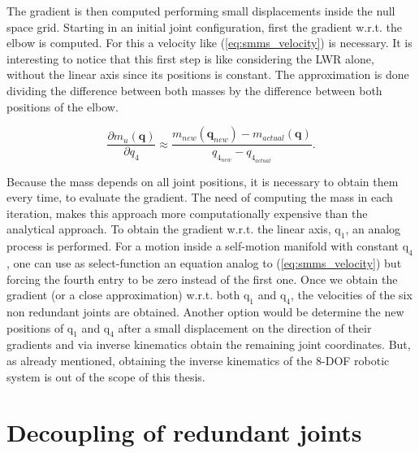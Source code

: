 The gradient is then computed performing small displacements inside the null space grid. Starting in an initial joint configuration, first the gradient w.r.t. the elbow is computed. For this a velocity like (\ref{eq:smms_velocity}) is necessary. It is interesting to notice that this first step is like considering the LWR alone, without the linear axis since its positions is constant. The approximation is done dividing the difference between both  masses by the difference between both positions of the elbow. 



\begin{equation}
\frac{\partial {m_u(\mathbf{q})}}{\partial {q_4}} \approx \frac{m_{new}(\mathbf{q}_{new}) - m_{actual}(\mathbf{q})}{ q_{4_{new}} - q_{4_{actual}}}.
\label{eq:approx_grad_q4}
\end{equation}



Because the mass depends on all joint positions, it is necessary to obtain them every time, to evaluate the gradient. The need of computing the mass in each iteration, makes this approach more computationally expensive than the analytical approach. To obtain the gradient w.r.t. the linear axis, $\mathrm{q_1}$, an analog process is performed. For a motion inside a self-motion manifold with constant $\mathrm{q_4}$, one can use as select-function an equation analog to (\ref{eq:smms_velocity}) but forcing the fourth entry to be zero instead of the first one. 
Once we obtain the gradient (or a close approximation) w.r.t. both $\mathrm{q_1}$ and $\mathrm{q_4}$, the velocities of the six non redundant joints are obtained. 
Another option would be determine the new positions of $\mathrm{q_1}$ and $\mathrm{q_4}$ after a small displacement on the direction of their gradients and via inverse kinematics obtain the remaining joint coordinates. But, as already mentioned, obtaining the inverse kinematics of the 8-DOF robotic system is out of the scope of this thesis.



\section{Decoupling of redundant joints}
\label{sec:Decoupling}
\label{subsubsec:weighting}


